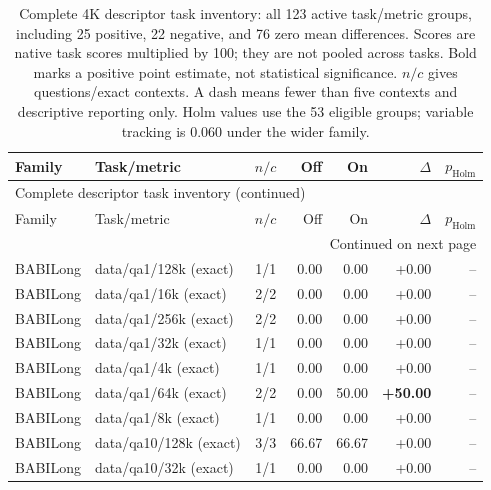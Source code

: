\begingroup\scriptsize
\setlength{\tabcolsep}{3pt}
\begin{longtable}{lp{3.1cm}rrrrr}
\caption{Complete 4K descriptor task inventory: all 123 active task/metric groups, including 25 positive, 22 negative, and 76 zero mean differences. Scores are native task scores multiplied by 100; they are not pooled across tasks. Bold marks a positive point estimate, not statistical significance. $n/c$ gives questions/exact contexts. A dash means fewer than five contexts and descriptive reporting only. Holm values use the 53 eligible groups; variable tracking is 0.060 under the wider family.}\label{tab:task-inventory}\\
\toprule
Family & Task/metric & $n/c$ & Off & On & $\Delta$ & $p_{\mathrm{Holm}}$ \\
\midrule
\endfirsthead
\multicolumn{7}{l}{Complete descriptor task inventory (continued)}\\
\toprule
Family & Task/metric & $n/c$ & Off & On & $\Delta$ & $p_{\mathrm{Holm}}$ \\
\midrule
\endhead
\midrule\multicolumn{7}{r}{Continued on next page}\\
\endfoot
\bottomrule
\endlastfoot
BABILong & \raggedright data/\allowbreak qa1/\allowbreak 128k {\tiny (exact)} & 1/1 & 0.00 & 0.00 & +0.00 & -- \\
BABILong & \raggedright data/\allowbreak qa1/\allowbreak 16k {\tiny (exact)} & 2/2 & 0.00 & 0.00 & +0.00 & -- \\
BABILong & \raggedright data/\allowbreak qa1/\allowbreak 256k {\tiny (exact)} & 2/2 & 0.00 & 0.00 & +0.00 & -- \\
BABILong & \raggedright data/\allowbreak qa1/\allowbreak 32k {\tiny (exact)} & 1/1 & 0.00 & 0.00 & +0.00 & -- \\
BABILong & \raggedright data/\allowbreak qa1/\allowbreak 4k {\tiny (exact)} & 1/1 & 0.00 & 0.00 & +0.00 & -- \\
BABILong & \raggedright data/\allowbreak qa1/\allowbreak 64k {\tiny (exact)} & 2/2 & 0.00 & 50.00 & \textbf{+50.00} & -- \\
BABILong & \raggedright data/\allowbreak qa1/\allowbreak 8k {\tiny (exact)} & 1/1 & 0.00 & 0.00 & +0.00 & -- \\
BABILong & \raggedright data/\allowbreak qa10/\allowbreak 128k {\tiny (exact)} & 3/3 & 66.67 & 66.67 & +0.00 & -- \\
BABILong & \raggedright data/\allowbreak qa10/\allowbreak 32k {\tiny (exact)} & 1/1 & 0.00 & 0.00 & +0.00 & -- \\

\end{longtable}
